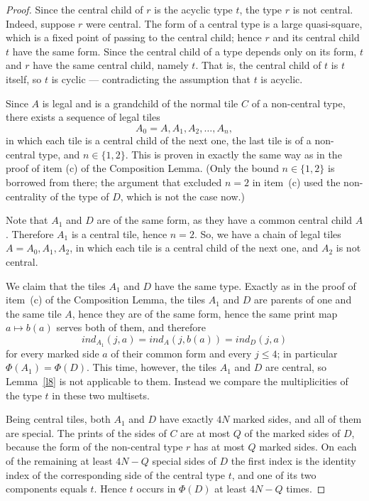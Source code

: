 \documentclass[10pt,a4paper]{amsart}
\newcommand{\ind}{\textit{ind}}
\begin{document}
\begin{proof}
Since the central child of $r$ is the acyclic type $t$,
the type $r$ is not central. Indeed, suppose $r$ were central. The form of a central type is a large quasi-square,
which is a fixed point of passing to the central child; hence $r$ and its central child $t$ have the same form.
Since the central child of a type depends only on its form, $t$ and $r$ have the same central child, namely $t$.
That is, the central child of $t$ is $t$ itself, so $t$ is cyclic --- contradicting the assumption that $t$ is acyclic.

Since $A$ is legal and is a grandchild of the normal tile $C$ of a non-central type, there exists a sequence of legal tiles
$$
A_0=A,A_1,A_2,\dots,A_n,
$$
in which each tile is a central child of the next one, the last tile is of a non-central type, and $n\in\{1,2\}$.
This is proven in exactly the same way as in the proof of item (c) of the Composition Lemma. (Only
the bound $n\in\{1,2\}$ is borrowed from there; the argument that excluded $n=2$ in item~(c) used
the non-centrality of the type of $D$, which is not the case now.)


Note that $A_1$ and $D$
are of the same form, as they have a common
central child $A$. Therefore $A_1$ is a central tile, hence $n=2$.
So, we have a chain of legal tiles $A=A_0,A_1,A_2$, in which each tile is a central child of the next one,
and $A_2$ is not central.

We claim that the tiles $A_1$ and $D$ have the same type. Exactly as in the proof of item~(c) of
the Composition Lemma, the tiles $A_1$ and $D$ are parents of one and the same tile $A$, hence
they are of the same form, hence the same print map $a\mapsto b(a)$ serves both of them, and
therefore
$$
\ind_{A_1}(j,a)=\ind_A(j,b(a))=\ind_D(j,a)
$$
for every marked side $a$ of their common form and every $j\le4$; in particular
$\Phi(A_1)=\Phi(D)$. This time, however, the tiles $A_1$ and $D$ are central, so
Lemma~\ref{l8} is not applicable to them. Instead we compare the multiplicities
of the type $t$ in these two multisets.

Being central tiles, both $A_1$ and $D$ have exactly $4N$ marked sides, and all of them are
special. The prints of the sides of $C$ are at most $Q$ of the marked sides of $D$, because the
form of the non-central type $r$ has at most $Q$ marked sides. On each of the remaining at least
$4N-Q$ special sides of $D$ the first index is the identity index of the corresponding side of the
central type $t$, and one of its two components equals $t$. Hence $t$ occurs in $\Phi(D)$ at least
$4N-Q$ times.


\end{proof}
\end{document}
